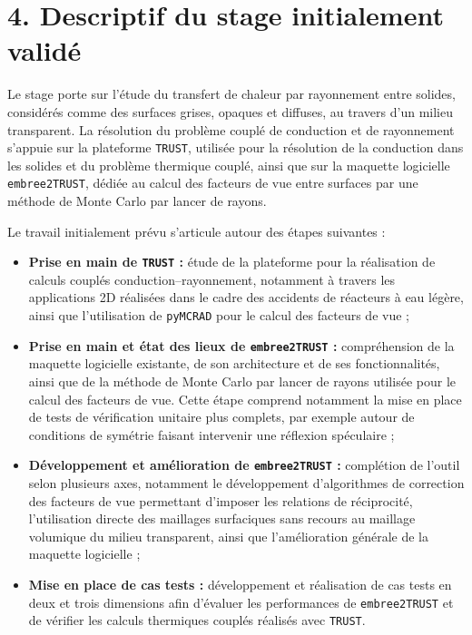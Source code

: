 
\section*{4. Descriptif du stage initialement validé}

Le stage porte sur l'étude du transfert de chaleur par rayonnement
entre solides, considérés comme des surfaces grises, opaques et
diffuses, au travers d'un milieu transparent. La résolution du
problème couplé de conduction et de rayonnement s'appuie sur la
plateforme \texttt{TRUST}, utilisée pour la résolution de la
conduction dans les solides et du problème thermique couplé, ainsi
que sur la maquette logicielle \texttt{embree2TRUST}, dédiée au
calcul des facteurs de vue entre surfaces par une méthode de Monte
Carlo par lancer de rayons.

Le travail initialement prévu s'articule autour des étapes
suivantes :

\begin{itemize}[leftmargin=1.5cm]

    \item \textbf{Prise en main de \texttt{TRUST} :} étude de la
    plateforme pour la réalisation de calculs couplés
    conduction--rayonnement, notamment à travers les applications
    2D réalisées dans le cadre des accidents de réacteurs à eau
    légère, ainsi que l'utilisation de \texttt{pyMCRAD} pour le
    calcul des facteurs de vue ;

    \item \textbf{Prise en main et état des lieux de
    \texttt{embree2TRUST} :} compréhension de la maquette logicielle
    existante, de son architecture et de ses fonctionnalités, ainsi
    que de la méthode de Monte Carlo par lancer de rayons utilisée
    pour le calcul des facteurs de vue. Cette étape comprend
    notamment la mise en place de tests de vérification unitaire
    plus complets, par exemple autour de conditions de symétrie
    faisant intervenir une réflexion spéculaire ;

    \item \textbf{Développement et amélioration de
    \texttt{embree2TRUST} :} complétion de l'outil selon plusieurs
    axes, notamment le développement d'algorithmes de correction des
    facteurs de vue permettant d'imposer les relations de
    réciprocité, l'utilisation directe des maillages surfaciques
    sans recours au maillage volumique du milieu transparent, ainsi
    que l'amélioration générale de la maquette logicielle ;

    \item \textbf{Mise en place de cas tests :} développement et
    réalisation de cas tests en deux et trois dimensions afin
    d'évaluer les performances de \texttt{embree2TRUST} et de
    vérifier les calculs thermiques couplés réalisés avec
    \texttt{TRUST}.
    
\end{itemize}


